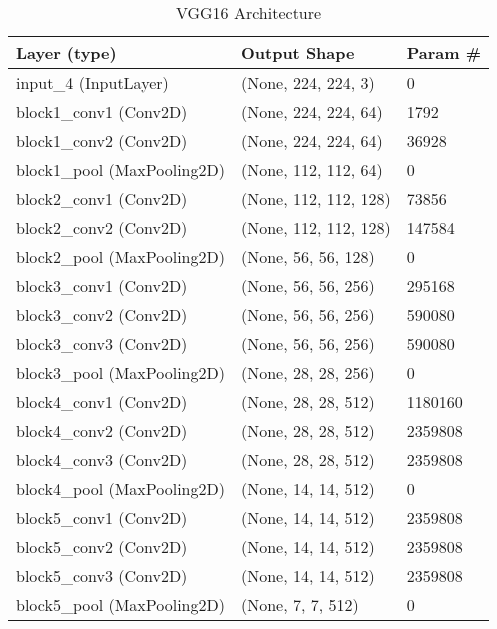 \documentclass{article}
\begin{document}
\begin{center}
\begin{longtable}[h]{ p{}  p{}  p{}}
\caption{VGG16 Architecture}\\
\hline
\hline
Layer (type)                  & Output Shape          & Param \#  \\ \hline
input\_4 (InputLayer)         & (None, 224, 224, 3)   & 0         \\ \hline
block1\_conv1 (Conv2D)        & (None, 224, 224, 64)  & 1792      \\ \hline
block1\_conv2 (Conv2D)        & (None, 224, 224, 64)  & 36928     \\ \hline
block1\_pool (MaxPooling2D)   & (None, 112, 112, 64)  & 0         \\ \hline
block2\_conv1 (Conv2D)        & (None, 112, 112, 128) & 73856     \\ \hline
block2\_conv2 (Conv2D)        & (None, 112, 112, 128) & 147584    \\ \hline
block2\_pool (MaxPooling2D)   & (None, 56, 56, 128)   & 0         \\ \hline
block3\_conv1 (Conv2D)        & (None, 56, 56, 256)   & 295168    \\ \hline
block3\_conv2 (Conv2D)        & (None, 56, 56, 256)   & 590080    \\ \hline
block3\_conv3 (Conv2D)        & (None, 56, 56, 256)   & 590080    \\ \hline
block3\_pool (MaxPooling2D)   & (None, 28, 28, 256)   & 0         \\ \hline
block4\_conv1 (Conv2D)        & (None, 28, 28, 512)   & 1180160   \\ \hline
block4\_conv2 (Conv2D)        & (None, 28, 28, 512)   & 2359808   \\ \hline
block4\_conv3 (Conv2D)        & (None, 28, 28, 512)   & 2359808   \\ \hline
block4\_pool (MaxPooling2D)   & (None, 14, 14, 512)   & 0         \\ \hline
block5\_conv1 (Conv2D)        & (None, 14, 14, 512)   & 2359808   \\ \hline
block5\_conv2 (Conv2D)        & (None, 14, 14, 512)   & 2359808   \\ \hline
block5\_conv3 (Conv2D)        & (None, 14, 14, 512)   & 2359808   \\ \hline
block5\_pool (MaxPooling2D)   & (None, 7, 7, 512)     & 0         \\ \hline

\end{longtable}
\end{center}
\end{document}

